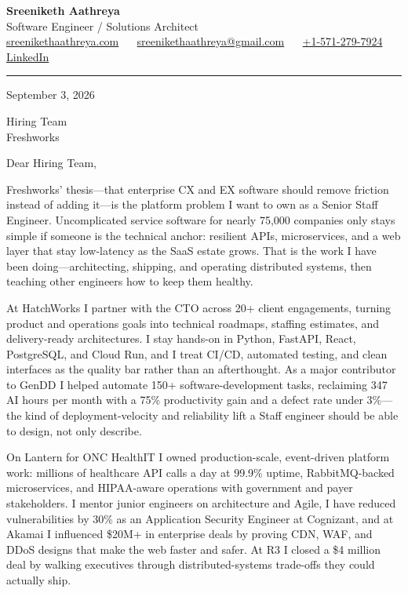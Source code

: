 \documentclass[11pt, letterpaper]{article}
\begin{document}
{\fontsize{18 pt}{20 pt}\selectfont\bfseries Sreeniketh Aathreya}\\[4pt]
Software Engineer / Solutions Architect\\[6pt]
\href{https://sreenikethaathreya.com}{sreenikethaathreya.com}
~\textbullet~
\href{mailto:sreenikethaathreya@gmail.com}{sreenikethaathreya@gmail.com}
~\textbullet~
\href{tel:+1-571-279-7924}{+1-571-279-7924}
~\textbullet~
\href{https://www.linkedin.com/in/sreeniketh-aathreya-16800b122/}{LinkedIn}

\vspace{12pt}
\hrule
\vspace{12pt}

September 3, 2026

\vspace{8pt}

Hiring Team\\
Freshworks

\vspace{12pt}

Dear Hiring Team,

Freshworks' thesis---that enterprise CX and EX software should remove friction instead of adding it---is the platform problem I want to own as a Senior Staff Engineer. Uncomplicated service software for nearly 75,000 companies only stays simple if someone is the technical anchor: resilient APIs, microservices, and a web layer that stay low-latency as the SaaS estate grows. That is the work I have been doing---architecting, shipping, and operating distributed systems, then teaching other engineers how to keep them healthy.

At HatchWorks I partner with the CTO across 20+ client engagements, turning product and operations goals into technical roadmaps, staffing estimates, and delivery-ready architectures. I stay hands-on in Python, FastAPI, React, PostgreSQL, and Cloud Run, and I treat CI/CD, automated testing, and clean interfaces as the quality bar rather than an afterthought. As a major contributor to GenDD I helped automate 150+ software-development tasks, reclaiming 347 AI hours per month with a 75\% productivity gain and a defect rate under 3\%---the kind of deployment-velocity and reliability lift a Staff engineer should be able to design, not only describe.

On Lantern for ONC HealthIT I owned production-scale, event-driven platform work: millions of healthcare API calls a day at 99.9\% uptime, RabbitMQ-backed microservices, and HIPAA-aware operations with government and payer stakeholders. I mentor junior engineers on architecture and Agile, I have reduced vulnerabilities by 30\% as an Application Security Engineer at Cognizant, and at Akamai I influenced \$20M+ in enterprise deals by proving CDN, WAF, and DDoS designs that make the web faster and safer. At R3 I closed a \$4 million deal by walking executives through distributed-systems trade-offs they could actually ship.
\end{document}
